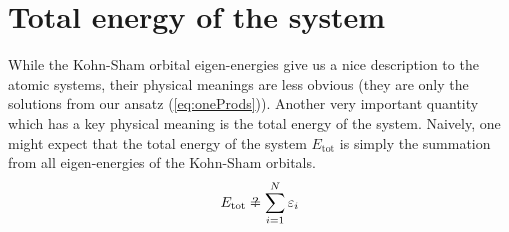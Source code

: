 \newpage
\section{Total energy of the system}
While the Kohn-Sham orbital eigen-energies give us a nice description to the
atomic systems, their physical meanings are less obvious (they are only
the solutions from our ansatz (\ref{eq:oneProds})). Another very important quantity
which has a key physical meaning is the total energy of the system.
Naively, one might expect that the total energy of the system $E_\text{tot}$ is
simply the summation from all eigen-energies of the Kohn-Sham orbitals.
\begin{equation} \label{eq:sumEeig}
E_\text{tot} \mathrel{\ooalign{\hss?\hss\cr=}} \sum_{i=1}^N{\varepsilon_i}
\end{equation}


